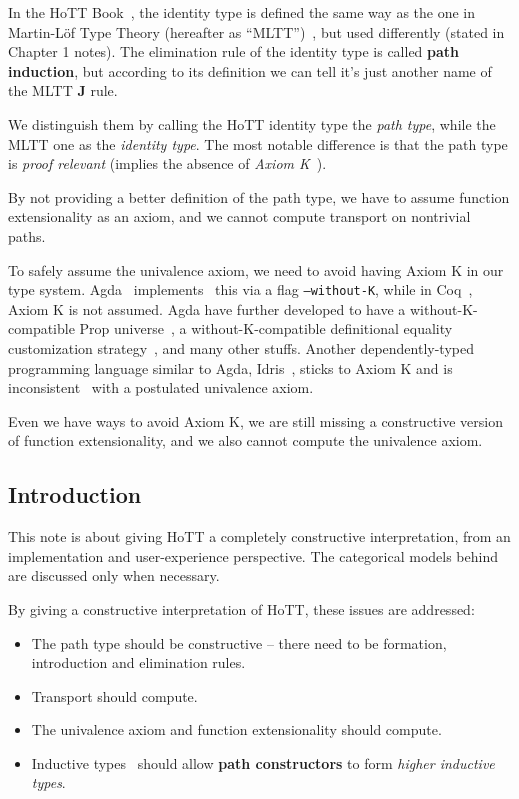 In the HoTT Book~\cite{hottbook},
the identity type is defined the same way as the one
in Martin-L\"{o}f Type Theory (hereafter as ``MLTT'')~\cite{MLTT},
but used differently (stated in Chapter 1 notes).
The elimination rule of the identity type is called \textbf{path induction},
but according to its definition we can tell
it's just another name of the MLTT \textbf J rule.

We distinguish them by calling the HoTT identity type the \textit{path type},
while the MLTT one as the \textit{identity type}.
The most notable difference is that the path type is
\textit{proof relevant} (implies the absence of
\textit{Axiom K}~\cite{AxiomK}).

By not providing a better definition of the path type,
we have to assume function extensionality as an axiom,
and we cannot compute transport on nontrivial paths.

To safely assume the univalence axiom, we need to avoid having Axiom K
in our type system.
Agda~\cite{Agda} implements~\cite{WithoutK} this via a flag \texttt{--without-K},
while in Coq~\cite{Coq}, Axiom K is not assumed.
Agda have further developed to have a without-K-compatible \textsf{Prop}
universe~\cite{PropWithoutK}, a without-K-compatible definitional equality
customization strategy~\cite{RewriteWithoutK}, and many other stuffs.
Another dependently-typed programming language similar to Agda,
Idris~\cite{Idris}, sticks to Axiom K and is
inconsistent~\cite{IdrisHoTT} with a postulated univalence axiom.

Even we have ways to avoid Axiom K,
we are still missing a constructive version of function extensionality,
and we also cannot compute the univalence axiom.

\subsection{Introduction}
\label{subsec:introduction}

This note is about giving HoTT a completely constructive interpretation,
from an implementation and user-experience perspective.
The categorical models behind are discussed only when necessary.

By giving a constructive interpretation of HoTT,
these issues are addressed:

\begin{itemize}
\item The path type should be constructive --
  there need to be formation, introduction and elimination rules.
\item Transport should compute.
\item The univalence axiom and function extensionality should compute.
\item Inductive types~\cite{Inductive} should allow \textbf{path constructors}
  to form \textit{higher inductive types}.
\end{itemize}